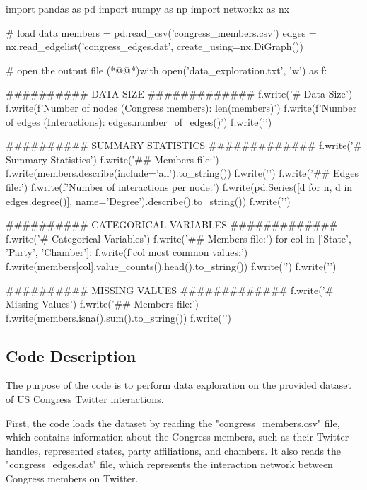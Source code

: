 \documentclass[11pt]{article}
\begin{document}
\begin{python}

import pandas as pd
import numpy as np
import networkx as nx

# load data
members = pd.read_csv('congress_members.csv')
edges = nx.read_edgelist('congress_edges.dat', create_using=nx.DiGraph())

# open the output file
(*@@*)with open('data_exploration.txt', 'w') as f:

    ########## DATA SIZE #############
    f.write('# Data Size\n')
    f.write(f'Number of nodes (Congress members): {len(members)}\n')
    f.write(f'Number of edges (Interactions): {edges.number_of_edges()}\n')
    f.write('\n')

    ########## SUMMARY STATISTICS #############
    f.write('# Summary Statistics\n')
    f.write('## Members file:\n')
    f.write(members.describe(include='all').to_string())
    f.write('\n')
    f.write('## Edges file:\n')
    f.write(f'Number of interactions per node:\n')
    f.write(pd.Series([d for n, d in edges.degree()], name='Degree').describe().to_string())
    f.write('\n\n')

    ########## CATEGORICAL VARIABLES #############
    f.write('# Categorical Variables\n')
    f.write('## Members file:\n')
    for col in ['State', 'Party', 'Chamber']:
        f.write(f'{col} most common values:\n')
        f.write(members[col].value_counts().head().to_string())
        f.write('\n')
    f.write('\n')
    
    ########## MISSING VALUES #############
    f.write('# Missing Values\n')
    f.write('## Members file:\n')
    f.write(members.isna().sum().to_string())  
    f.write('\n\n')


\end{python}

\subsection{Code Description}

The purpose of the code is to perform data exploration on the provided dataset of US Congress Twitter interactions.

First, the code loads the dataset by reading the "congress\_members.csv" file, which contains information about the Congress members, such as their Twitter handles, represented states, party affiliations, and chambers. It also reads the "congress\_edges.dat" file, which represents the interaction network between Congress members on Twitter.
\end{document}
